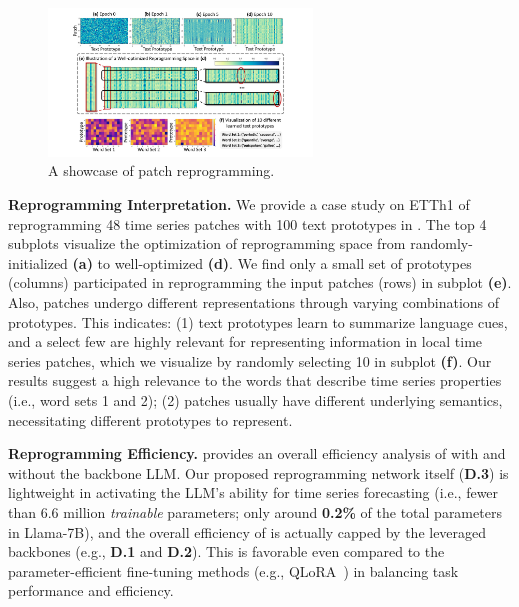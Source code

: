 

\begin{figure}
\vspace{-3.6mm}
\centering
\includegraphics[width=7cm]{figures/reprogramming-showcase-v3.pdf}
\caption{A showcase of patch reprogramming.}
\label{fig:reprogramming_showcase}
\vspace{-4mm}
\end{figure}

\noindent\textbf{Reprogramming Interpretation.}
We provide a case study on ETTh1 of reprogramming 48 time series patches with 100 text prototypes in . The top 4 subplots visualize the optimization of reprogramming space from randomly-initialized \textbf{(a)} to well-optimized \textbf{(d)}. We find only a small set of prototypes (columns) participated in reprogramming the input patches (rows) in subplot \textbf{(e)}. Also, patches undergo different representations through varying combinations of prototypes. This indicates: (1) text prototypes learn to summarize language cues, and a select few are highly relevant for representing information in local time series patches, which we visualize by randomly selecting 10 in subplot \textbf{(f)}. Our results suggest a high relevance to the words that describe time series properties (i.e., word sets 1 and 2); (2) patches usually have different underlying semantics, necessitating different prototypes to represent.

\noindent\textbf{Reprogramming Efficiency.}
 provides an overall efficiency analysis of \method with and without the backbone LLM. Our proposed reprogramming network itself (\textbf{D.3}) is lightweight in activating the LLM's ability for time series forecasting (i.e., fewer than 6.6 million \textit{trainable} parameters; only around \textbf{0.2\%} of the total parameters in Llama-7B), and the overall efficiency of \method is actually capped by the leveraged backbones (e.g., \textbf{D.1} and \textbf{D.2}). This is favorable even compared to the parameter-efficient fine-tuning methods (e.g., QLoRA~\citep{dettmers2023qlora}) in balancing task performance and efficiency.


